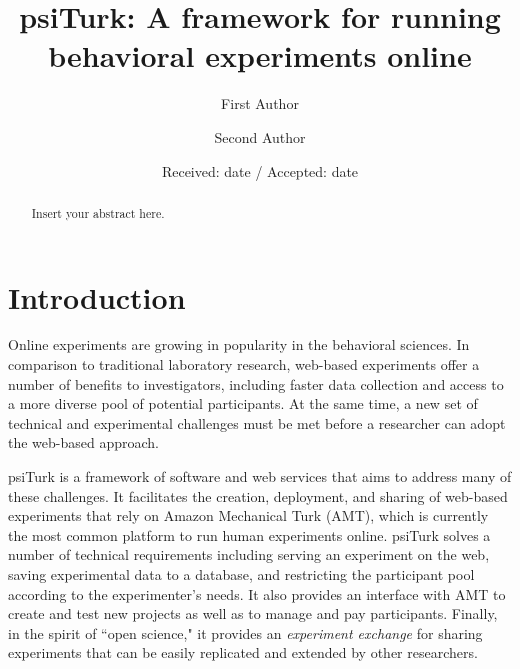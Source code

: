 \documentclass[twocolumn]{svjour3}          %
\begin{document}
\title{psiTurk: A framework for running behavioral experiments online}

\author{First Author         \and
        Second Author %
}




\date{Received: date / Accepted: date}

\maketitle

\begin{abstract}
Insert your abstract here.
\end{abstract}


\section{Introduction}

Online experiments are growing in popularity in the behavioral sciences.
In comparison to traditional laboratory research, web-based experiments offer a number of benefits to investigators, including faster data collection and access to a more diverse pool of potential participants.
At the same time, a new set of technical and experimental challenges must be met before a researcher can adopt the web-based approach.

psiTurk is a framework of software and web services that aims to address many of these challenges.
It facilitates the creation, deployment, and sharing of web-based experiments that rely on Amazon Mechanical Turk (AMT),
 which is currently the most common platform to run human experiments online.
psiTurk solves a number of technical requirements including serving an experiment on the web, saving experimental data to a database, and restricting the participant pool according to the experimenter's needs. It also provides an interface with AMT to create and test new projects as well as to manage and
 pay participants.
Finally, in the spirit of ``open science," it provides an \emph{experiment exchange} for sharing experiments that can be easily replicated and extended by other researchers.
\end{document}
